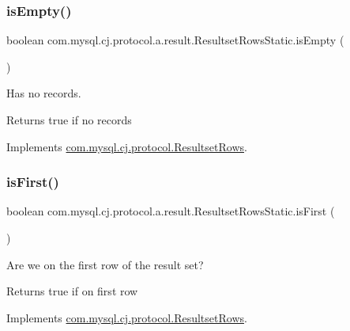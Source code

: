 \subsubsection{\texorpdfstring{is\+Empty()}{isEmpty()}}
{\footnotesize\ttfamily boolean com.\+mysql.\+cj.\+protocol.\+a.\+result.\+Resultset\+Rows\+Static.\+is\+Empty (\begin{DoxyParamCaption}{ }\end{DoxyParamCaption})}

Has no records.

\begin{DoxyReturn}{Returns}
true if no records 
\end{DoxyReturn}


Implements \mbox{\hyperlink{interfacecom_1_1mysql_1_1cj_1_1protocol_1_1_resultset_rows_ae130183c4bba57a93d3fe890f14b6c25}{com.\+mysql.\+cj.\+protocol.\+Resultset\+Rows}}.

\mbox{\label{classcom_1_1mysql_1_1cj_1_1protocol_1_1a_1_1result_1_1_resultset_rows_static_ad16947839519d3bf8c5bc679f6920b5c}} 
\subsubsection{\texorpdfstring{is\+First()}{isFirst()}}
{\footnotesize\ttfamily boolean com.\+mysql.\+cj.\+protocol.\+a.\+result.\+Resultset\+Rows\+Static.\+is\+First (\begin{DoxyParamCaption}{ }\end{DoxyParamCaption})}

Are we on the first row of the result set?

\begin{DoxyReturn}{Returns}
true if on first row 
\end{DoxyReturn}


Implements \mbox{\hyperlink{interfacecom_1_1mysql_1_1cj_1_1protocol_1_1_resultset_rows_ae7d5b7ca8787eaca7ee5e0ca69ac2818}{com.\+mysql.\+cj.\+protocol.\+Resultset\+Rows}}.

\mbox{\label{classcom_1_1mysql_1_1cj_1_1protocol_1_1a_1_1result_1_1_resultset_rows_static_a2714d5e0fe10d3cb3b148a3fb2d6fec4}} 
